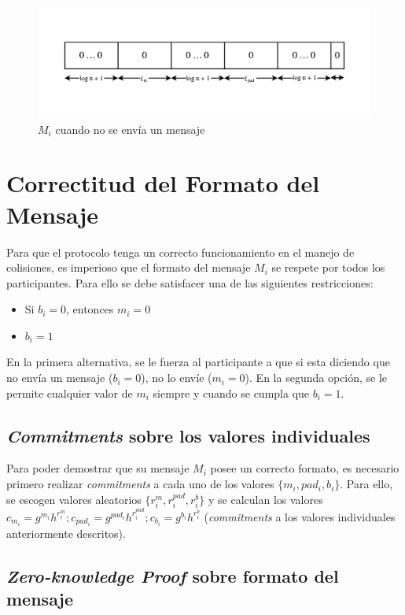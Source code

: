 \begin{figure}
  \centering
    \includegraphics[width=1\textwidth]{imagenes/message-format-nomessage.pdf}
  \caption{$M_i$ cuando no se envía un mensaje}
\end{figure}

\section{Correctitud del Formato del Mensaje}

Para que el protocolo tenga un correcto funcionamiento en el manejo de colisiones, es imperioso que el formato del mensaje $M_i$ se respete por todos los participantes. Para ello se debe satisfacer una de las siguientes restricciones:
\begin{itemize}
    \item Si $b_i = 0$, entonces $m_i = 0$
    \item $b_i = 1$
\end{itemize}
En la primera alternativa, se le fuerza al participante a que si esta diciendo que no envía un mensaje ($b_i = 0$), no lo envíe ($m_i = 0$). En la segunda opción, se le permite cualquier valor de $m_i$ siempre y cuando se cumpla que $b_i = 1$.

\subsection{\emph{Commitments} sobre los valores individuales}

Para poder demostrar que su mensaje $M_i$ posee un correcto formato, es necesario primero realizar \emph{commitments} a cada uno de los valores $\{m_i, pad_i, b_i\}$. Para ello, se escogen valores aleatorios $\{r_i^m, r_i^{pad}, r_i^b\}$ y se calculan los valores $c_{m_i} = g^{m_i} h^{r_i^m}; c_{pad_i} = g^{pad_i} h^{r_i^{pad}}; c_{b_i} = g^{b_i} h^{r_i^b}$ (\emph{commitments} a los valores individuales anteriormente descritos).

\subsection{\emph{Zero-knowledge Proof} sobre formato del mensaje}

